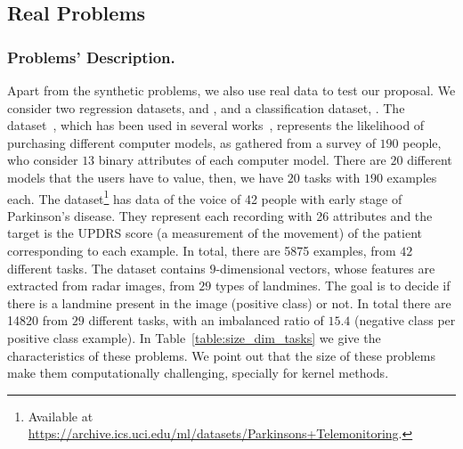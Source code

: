 \subsection{Real Problems}

\subsubsection*{Problems' Description.}

%

%

Apart from the synthetic problems, we also use real data to test our proposal. We consider two regression datasets,  and , and a classification dataset, .
%
The  dataset~\cite{Lenk96}, which has been used in several works~\citep{ArgyriouEP08,AgarwalDG10,KumarD12,JeongJ18}, represents the likelihood of purchasing different computer models, as gathered from a survey of $190$ people, who consider $13$ binary attributes of each computer model. There are $20$ different models that the users have to value, then, we have $20$ tasks with $190$ examples each.
%
The  dataset\footnote{Available at \url{https://archive.ics.uci.edu/ml/datasets/Parkinsons+Telemonitoring}.} has data of the voice of 42 people with early stage of Parkinson's disease. They represent each recording with 26 attributes and the target is the UPDRS score (a measurement of the movement) of the patient corresponding to each example. 
In total, there are \num{5875} examples, from $42$ different tasks.
%
The  dataset contains $9$-dimensional vectors, whose features are extracted from radar images, from $29$ types of landmines. The goal is to decide if there is a landmine present in the image (positive class) or not. In total there are \num{14820} from $29$ different tasks, with an imbalanced ratio of $15.4$ (negative class per positive class example).
%
In Table~\ref{table:size_dim_tasks} we give the characteristics of these problems.
We point out that the size of these problems make them computationally challenging, specially for kernel methods.


\begin{table*}[t!]
    \caption{Sample sizes, dimensions and number of tasks of the datasets used.}
    \label{table:size_dim_tasks}
    \centering
\end{table*}


